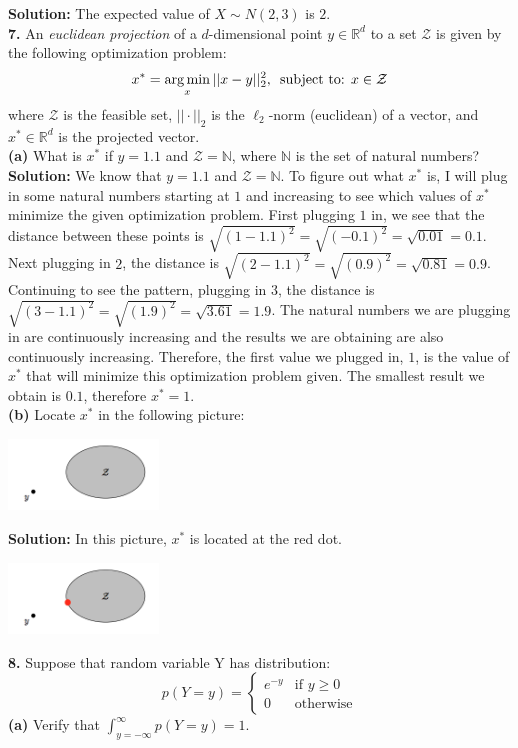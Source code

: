 \documentclass[a4paper]{article}
\begin{document}
\textbf{Solution:} The expected value of $X \sim N(2, 3)$ is $2$.\\
\textbf{7.} An \textit{euclidean projection} of a $d$-dimensional point $y \in \mathbb{R}^d$ 
to a set $\mathcal{Z}$ is given by the following optimization problem:
\begin{equation}
  x^* = \mathop{\arg \min}_{x} ||x - y||^2_2 \text{, \space subject to: } x \in \mathcal{Z}
\end{equation}
where $\mathcal{Z}$ is the feasible set, $||\cdot||_2$ is the $\ell_2$-norm (euclidean) of a 
vector, and $x^* \in \mathbb{R}^d$ is the projected vector.\\
\textbf{(a)} What is $x^*$ if $y=1.1$ and $\mathcal{Z} = \mathbb{N}$, where $\mathbb{N}$ is the 
set of natural numbers?\\

\textbf{Solution:} We know that $y=1.1$ and $\mathcal{Z} = \mathbb{N}$.  To figure out what $x^*$ 
is, I will plug in some natural numbers starting at $1$ and increasing to see which values of $x^*$ 
minimize the given optimization problem. First plugging $1$ in, we see that the distance between 
these points is $\sqrt{(1-1.1)^2} = \sqrt{(-0.1)^2} = \sqrt{0.01} = 0.1$.  Next plugging in $2$, 
the distance is $\sqrt{(2-1.1)^2} = \sqrt{(0.9)^2} = \sqrt{0.81} = 0.9$.  Continuing to see the 
pattern, plugging in $3$, the distance is $\sqrt{(3-1.1)^2} = \sqrt{(1.9)^2} = \sqrt{3.61} = 1.9$.  
The natural numbers we are plugging in are continuously increasing and the results we are obtaining 
are also continuously increasing.  Therefore, the first value we plugged in, $1$, is the value of 
$x^*$ that will minimize this optimization problem given.  The smallest result we obtain is $0.1$, 
therefore $x^* = 1$.\\
\textbf{(b)} Locate $x^*$ in the following picture:
\begin{center}
  \includegraphics[width=0.3\textwidth]{question7.jpg}
\end{center}

\textbf{Solution:} In this picture, $x^*$ is located at the red dot.
\begin{center}
  \includegraphics[width=0.3\textwidth]{question7solution.jpg}
\end{center}
\textbf{8.} Suppose that random variable Y has distribution:
\[
  p(Y=y) =
  \begin{cases}
  e^{-y} & \text{if } y \geq 0\\
  0 & \text{otherwise}
  \end{cases}
\]
\textbf{(a)} Verify that $\int_{y=-\infty}^\infty p(Y=y) = 1$.
\end{document}
